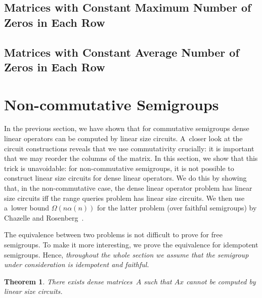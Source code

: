 \documentclass[11pt,letterpaper]{article}
\newtheorem{theorem}{Theorem}
\begin{document}
\subsection{Matrices with Constant Maximum Number of Zeros in Each Row}

\subsection{Matrices with Constant Average Number of Zeros in Each Row}

\section{Non-commutative Semigroups}
In the previous section, we have shown that for commutative semigroups dense linear operators can be computed by linear size circuits. A~closer look at the circuit constructions reveals that we use commutativity crucially: it is important that we may reorder the columns of the matrix. In this section, we show that this trick is unavoidable: for non-commutative semigroups, it is not possible to construct linear size circuits for dense linear operators. We do this by showing that, in the non-commutative case, the dense linear operator problem has linear size circuits iff the range queries problem has linear size circuits. We then use a~lower bound $\Omega(n\alpha(n))$ for the latter problem (over faithful semigroups) by Chazelle and Rosenberg~\cite{DBLP:journals/ijcga/ChazelleR91}. 

The equivalence between two problems is not difficult to prove for free semigroups. To make it more interesting, we prove the equivalence for idempotent semigroups. Hence, {\em throughout the whole section we assume that the semigroup under consideration is idempotent and faithful.}

\begin{theorem}
There exists dense matrices~$A$ such that $Ax$ cannot be computed by linear size circuits.
\end{theorem}

\begin{center}
\end{center}
\end{document}
